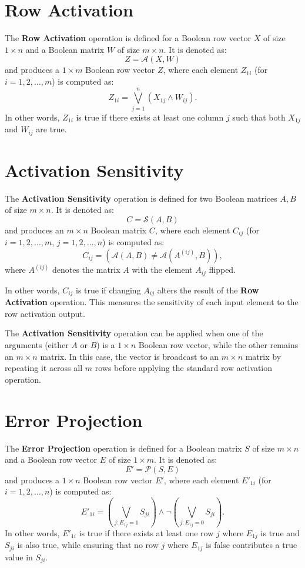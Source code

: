 \documentclass{article}
\begin{document}
\section{Row Activation}
The \textbf{Row Activation} operation is defined for a Boolean row vector \( X \) of size \( 1 \times n \) and a Boolean matrix \( W \) of size \( m \times n \). It is denoted as:
\[
Z = \mathcal{A}(X, W)
\]
and produces a \( 1 \times m \) Boolean row vector \( Z \), where each element \( Z_{1i} \) (for \( i = 1, 2, \dots, m \)) is computed as:
\[
Z_{1i} = \bigvee_{j=1}^{n} \left( X_{1j} \wedge W_{ij} \right).
\]
In other words, \( Z_{1i} \) is true if there exists at least one column \( j \) such that both \( X_{1j} \) and \( W_{ij} \) are true.

\section{Activation Sensitivity}
The \textbf{Activation Sensitivity} operation is defined for two Boolean matrices \( A, B \) of size \( m \times n \). It is denoted as:
\[
C = \mathcal{S}(A, B)
\]
and produces an \( m \times n \) Boolean matrix \( C \), where each element \( C_{ij} \) (for \( i = 1, 2, \dots, m \), \( j = 1, 2, \dots, n \)) is computed as:
\[
C_{ij} = \left( \mathcal{A}(A, B) \neq \mathcal{A}(A^{(ij)}, B) \right),
\]
where \( A^{(ij)} \) denotes the matrix \( A \) with the element \( A_{ij} \) flipped.

In other words, \( C_{ij} \) is true if changing \( A_{ij} \) alters the result of the \textbf{Row Activation} operation. This measures the sensitivity of each input element to the row activation output.

The \textbf{Activation Sensitivity} operation can be applied when one of the arguments (either \( A \) or \( B \)) is a \( 1 \times n \) Boolean row vector, while the other remains an \( m \times n \) matrix. In this case, the vector is broadcast to an \( m \times n \) matrix by repeating it across all \( m \) rows before applying the standard row activation operation.

\section{Error Projection}
The \textbf{Error Projection} operation is defined for a Boolean matrix \( S \) of size \( m \times n \) and a Boolean row vector \( E \) of size \( 1 \times m \). It is denoted as:
\[
E' = \mathcal{P}(S, E)
\]
and produces a \( 1 \times n \) Boolean row vector \( E' \), where each element \( E'_{1i} \) (for \( i = 1, 2, \dots, n \)) is computed as:
\[
E'_{1i} = \left( \bigvee_{j: E_{1j} = 1} S_{ji} \right) \wedge \neg \left( \bigvee_{j: E_{1j} = 0} S_{ji} \right).
\]
In other words, \( E'_{1i} \) is true if there exists at least one row \( j \) where \( E_{1j} \) is true and \( S_{ji} \) is also true, while ensuring that no row \( j \) where \( E_{1j} \) is false contributes a true value in \( S_{ji} \).
\end{document}
